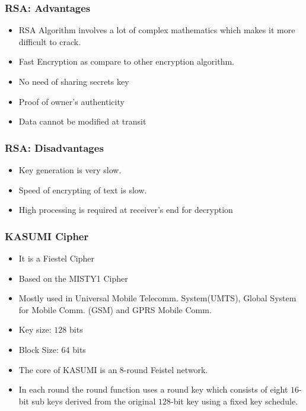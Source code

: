 \documentclass{beamer}
\begin{document}
\begin{frame}[t]
	\frametitle{RSA: Advantages}
	\begin{itemize}
		\item RSA Algorithm involves a lot of complex mathematics which makes it more difficult to crack.
		\item Fast Encryption as compare to other encryption algorithm.
		\item No need of sharing secrets key
		\item Proof of owner's authenticity
		\item Data cannot be modified at transit
	\end{itemize}
\end{frame}
\begin{frame}[t]
	\frametitle{RSA: Disadvantages}
	\begin{itemize}
	\item Key generation is very slow.
	\item Speed of encrypting of text is slow. 
	\item High processing is required at receiver’s end for decryption
	\end{itemize}
\end{frame}

\begin{frame}[t]
	\frametitle{KASUMI Cipher}
	\begin{itemize}
		\item It is a Fiestel Cipher
		\item Based on the MISTY1 Cipher
		\item Mostly used in Universal Mobile Telecomm. System(UMTS), Global System for Mobile Comm. (GSM) and GPRS Mobile Comm.
 		\item Key size: $128$ bits
 		\item Block Size: $64$ bits
 		\item The core of KASUMI is an $8$-round Feistel network.
 		\item In each round the round function uses a round key which consists of eight $16$-bit sub keys derived from the original $128$-bit key using a fixed key schedule.
	\end{itemize}

\end{frame}
\end{document}

